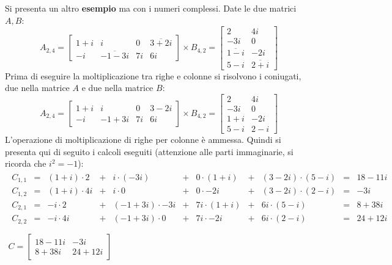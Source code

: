 \documentclass[a4paper]{article}
\begin{document}
	\noindent
	Si presenta un altro \textcolor{Green4}{\textbf{esempio}} ma con i numeri complessi. Date le due matrici $A, B$:
	\begin{equation*}
		A_{2,4} = \begin{bmatrix}
			1+i	& i					& 0		& \overline{3+2i} \\
			-i 	& \overline{-1-3i} 	& 7i	& 6i
		\end{bmatrix} \times
		B_{4,2} = \begin{bmatrix}
			2  				& 4i 	\\
			-3i				& 0 	\\
			\overline{1-i} 	& -2i	\\
			5-i				& \overline{2+i}
		\end{bmatrix}
	\end{equation*}
	Prima di eseguire la moltiplicazione tra righe e colonne si risolvono i coniugati, due nella matrice $A$ e due nella matrice $B$:
	\begin{equation*}
		A_{2,4} = \begin{bmatrix}
			1+i	& i			& 0		& 3-2i \\
			-i 	& -1+3i 	& 7i	& 6i
		\end{bmatrix} \times
		B_{4,2} = \begin{bmatrix}
			2  	& 4i 	\\
			-3i	& 0 	\\
			1+i	& -2i	\\
			5-i	& 2-i
		\end{bmatrix}
	\end{equation*}
	L'operazione di moltiplicazione di righe per colonne è ammessa. Quindi si presenta qui di seguito i calcoli eseguiti (attenzione alle parti immaginarie, si ricorda che $i^{2} = -1$):
	\begin{gather*}
		\begin{array}{llllllllllll}
			C_{1,1} & = & \left(1+i\right) \cdot 2 	& + & i \cdot \left(-3i\right) 		& + & 0 \cdot \left(1+i\right) 	& + & \left(3-2i\right) \cdot \left(5-i\right) 	& = & 18-11i \\
			C_{1,2} & = & \left(1+i\right) \cdot 4i 	& + & i \cdot 0 		& + & 0 \cdot -2i	& + & \left(3-2i\right) \cdot \left(2-i\right)	& = & -3i  \\
			C_{2,1} & = & -i \cdot 2	& + & \left(-1+3i\right) \cdot -3i 	& + & 7i \cdot \left(1+i\right) 	& + & 6i \cdot \left(5-i\right) 		& = & 8 + 38i \\
			C_{2,2} & = & -i \cdot 4i 	& + & \left(-1+3i\right) \cdot 0 	& + & 7i \cdot -2i 	& + & 6i \cdot \left(2-i\right) 		& = & 24 + 12i
		\end{array}\\
		\\
		C = \begin{bmatrix}
			18-11i & -3i \\
			8+38i & 24+12i
		\end{bmatrix}
	\end{gather*}\newpage
\end{document}
